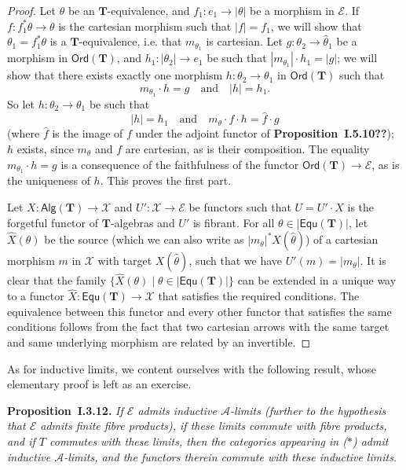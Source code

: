 \documentclass{article}
\newenvironment{itenv}[1]
  {\phantomsection\par\medskip\noindent\textbf{#1.}\itshape}
  {\par\medskip}
\newcommand{\oldpage}[1]{\marginpar{\footnotesize$\Big\vert$ \textit{p.~#1}}}
\newcommand{\unsure}[1]{{\color{purple}\textbf{#1}}}
\newcommand{\TT}{\mathbf{T}}
\newcommand{\textand}{\quad\text{and}\quad}
\newcommand{\cat}[1]{\mathcal{#1}}
\newcommand{\Cat}[1]{\mathsf{#1}}
\newcommand{\set}[1]{|#1|}
\newcommand{\Alg}[1]{\Cat{Alg}(#1)}
\newcommand{\Ord}[1]{\Cat{Ord}(#1)}
\newcommand{\Equ}[1]{\Cat{Equ}(#1)}
\begin{document}
\begin{proof}
  Let $\theta$ be an $\TT$-equivalence, and $f_1\colon e_1\to\set{\theta}$ be a morphism in $\cat{E}$.
  If $f\colon f_1^*\theta\to\theta$ is the cartesian morphism such that $\set{f}=f_1$, we will show that $\theta_1=f_1^*\theta$ is a $\TT$-equivalence, i.e. that $m_{\theta_1}$ is cartesian.
  \oldpage{242}
  Let $g\colon\theta_2\to\hat{\theta}_1$ be a morphism in $\Ord{\TT}$, and $h_1\colon\set{\theta_2}\to e_1$ be such that $\set{m_{\theta_1}}\cdot h_1=\set{g}$;
  we will show that there exists exactly one morphism $h\colon\theta_2\to\theta_1$ in $\Ord{\TT}$ such that
  \[
    m_{\theta_1}\cdot h = g
    \textand
    \set{h} = h_1.
  \]
  So let $h\colon\theta_2\to\theta_1$ be such that
  \[
    \set{h} = h_1
    \textand
    m_\theta\cdot f\cdot h = \hat{f}\cdot g
  \]
  (where $\hat{f}$ is the image of $f$ under the adjoint functor of \unsure{Proposition~I.5.10??});
  $h$ exists, since $m_\theta$ and $f$ are cartesian, as is their composition.
  The equality $m_{\theta_1}\cdot h=g$ is a consequence of the faithfulness of the functor $\Ord{\TT}\to\cat{E}$, as is the uniqueness of $h$.
  This proves the first part.

  Let $X\colon\Alg{\TT}\to\cat{X}$ and $U'\colon\cat{X}\to\cat{E}$ be functors such that $U=U'\cdot X$ is the forgetful functor of $\TT$-algebras and $U'$ is fibrant.
  For all $\theta\in\set{\Equ{\TT}}$, let $\hat{X}(\theta)$ be the source (which we can also write as $\set{m_\theta}^*X(\hat{\theta})$) of a cartesian morphism $m$ in $\cat{X}$ with target $X(\hat{\theta})$, such that we have $U'(m)=\set{m_\theta}$.
  It is clear that the family $\{\hat{X}(\theta)\mid\theta\in\set{\Equ{\TT}}\}$ can be extended in a unique way to a functor $\hat{X}\colon\Equ{\TT}\to\cat{X}$ that satisfies the required conditions.
  The equivalence between this functor and every other functor that satisfies the same conditions follows from the fact that two cartesian arrows with the same target and same underlying morphism are related by an invertible.
\end{proof}

As for inductive limits, we content ourselves with the following result, whose elementary proof is left as an exercise.

\begin{itenv}{Proposition~I.3.12}
  If $\cat{E}$ admits inductive $\cat{A}$-limits (further to the hypothesis that $\cat{E}$ admits finite fibre products), if these limits commute with fibre products, and if $T$ commutes with these limits, then the categories appearing in ($\ast$) admit inductive $\cat{A}$-limits, and the functors therein commute with these inductive limits.
\end{itenv}
\end{document}
